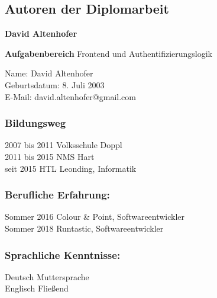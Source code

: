 \begin{spacing}{1}
    \chapter*{Autoren der Diplomarbeit}
  \end{spacing}

\textbf{David Altenhofer}

\textbf{Aufgabenbereich}
Frontend und Authentifizierungslogik

\begin{flushleft}
Name: David Altenhofer\\
Geburtsdatum: 8. Juli 2003\\
E-Mail: david.altenhofer@gmail.com
\end{flushleft}

\subsection*{Bildungsweg}
2007 bis 2011 Volksschule Doppl\\
2011 bis 2015 NMS Hart\\
seit 2015 HTL Leonding, Informatik

\subsection*{Berufliche Erfahrung:}
Sommer 2016 Colour \& Point, Softwareentwickler\\
Sommer 2018 Runtastic, Softwareentwickler

\subsection*{Sprachliche Kenntnisse:}
Deutsch Muttersprache\\
Englisch Fließend
